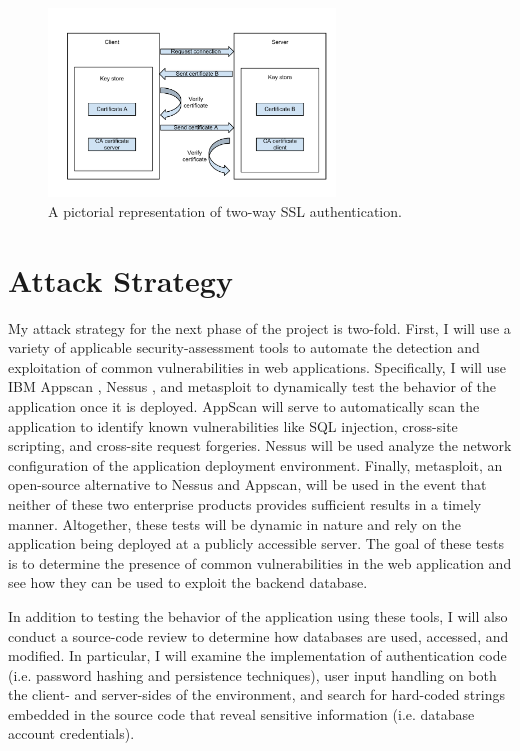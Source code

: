 \documentclass{sig-alternate}
\begin{document}
\begin{figure}[ht!]
\begin{center}
\includegraphics[width=3in]{images/two_way_ssl.pdf}
\caption{A pictorial representation of two-way SSL authentication.}
\label{fig:ssl}
\end{center}
\end{figure}

\section{Attack Strategy}
\label{sec:attack}

My attack strategy for the next phase of the project is two-fold. First, I will use a variety of applicable security-assessment 
tools to automate the detection and exploitation of common vulnerabilities in web applications. 
Specifically, I will use IBM Appscan \cite{_ibm_appscan}, Nessus \cite{_nessus}, and metasploit \cite{_penetration_metasploit} to dynamically test the behavior
of the application once it is deployed. AppScan will serve to automatically scan the application to identify
known vulnerabilities like SQL injection, cross-site scripting, and cross-site request forgeries. Nessus will be used
analyze the network configuration of the application deployment environment. Finally, metasploit, an open-source
alternative to Nessus and Appscan, will be used in the event that neither of these two enterprise products provides
sufficient results in a timely manner. Altogether, these tests will be dynamic in nature and rely on the 
application being deployed at a publicly
accessible server. The goal of these tests is to determine the presence of common vulnerabilities in the web application
and see how they can be used to exploit the backend database. 

In addition to testing the behavior of the application using these tools, I will also conduct a source-code review 
to determine how databases are used, accessed, and modified. In particular, I will examine the implementation of 
authentication code (i.e. password hashing and persistence techniques), user input handling on 
both the client- and server-sides of the environment, and search for hard-coded strings embedded in 
the source code that reveal sensitive information (i.e. database account credentials).
\end{document}
